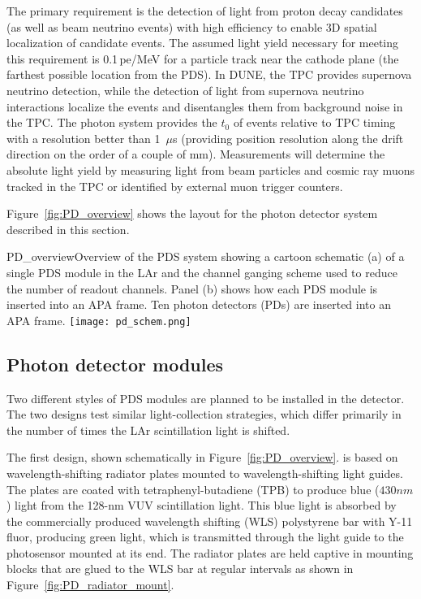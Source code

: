 The primary requirement is the detection of light from proton decay
candidates (as well as beam neutrino events) with high efficiency to
enable 3D spatial localization of candidate events. The assumed light yield necessary for
meeting this requirement is 0.1\,pe/MeV for a particle track near the cathode plane
(the farthest possible location from the PDS). In DUNE, 
the TPC  provides supernova neutrino detection, while the detection of light
from supernova neutrino interactions localize the events and disentangles
them from background noise in the TPC.
The photon system provides the $t_0$  of
events relative to TPC timing with a resolution better than 1~$\mu$s
(providing position resolution along the drift direction on the order of a couple of mm). 
Measurements %
will determine the absolute
light yield by measuring light from beam particles and cosmic ray muons
tracked in the TPC or identified by external muon trigger counters.

Figure~\ref{fig:PD_overview} shows the layout for the photon detector
system described in this section. %

\begin{cdrfigure}{PD_overview}{Overview of the PDS
    system showing a cartoon schematic (a) of a single PDS module
    in the LAr and the channel ganging scheme used to reduce the
    number of readout channels. Panel (b) shows how each PDS module
   is inserted into an APA frame. Ten photon detectors (PDs) are inserted
    into an APA frame.}
\texttt{[image: pd\_schem.png]}
\end{cdrfigure}

\subsection{Photon detector modules}

Two different styles of PDS 
modules are planned to be installed in the detector.  The two designs test similar light-collection strategies, which differ primarily in  the number of times the LAr scintillation 
light is shifted.  

The first design, shown schematically in Figure~\ref{fig:PD_overview}. is based on
wavelength-shifting radiator plates mounted to wavelength-shifting light guides.
The plates are coated 
with tetraphenyl-butadiene (TPB) to produce blue ($430nm$) light from the 128-nm VUV 
scintillation light.  
This blue light is absorbed by the commercially produced wavelength shifting (WLS)
polystyrene bar with Y-11 fluor, producing green light, which is transmitted
through the light guide to the photosensor 
mounted at its end.
The radiator plates are held captive in mounting blocks that are glued to the WLS bar
at regular intervals as shown in Figure~\ref{fig:PD_radiator_mount}.

